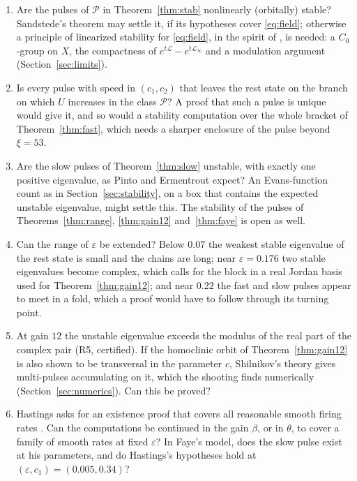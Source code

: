 \documentclass[11pt]{article}
\theoremstyle{definition}
\newcommand{\eps}{\varepsilon}
\newcommand{\Lop}{\mathcal{L}}
\newcommand{\Pcl}{\mathcal{P}}
\begin{document}
\begin{enumerate}
\item Are the pulses of $\Pcl$ in Theorem~\ref{thm:stab} nonlinearly (orbitally) stable? Sandstede's theorem \cite{sandstede2007} may settle it, if its hypotheses cover \eqref{eq:field}; otherwise a principle of linearized stability for \eqref{eq:field}, in the spirit of \cite{hv2024}, is needed: a $C_0$-group on $X$, the compactness of $e^{t\Lop} - e^{t\Lop_\infty}$ and a modulation argument (Section~\ref{sec:limits}).
\item Is every pulse with speed in $(c_1, c_2)$ that leaves the rest state on the branch on which $U$ increases in the class $\Pcl$? A proof that such a pulse is unique would give it, and so would a stability computation over the whole bracket of Theorem~\ref{thm:fast}, which needs a sharper enclosure of the pulse beyond $\xi = 53$.
\item Are the slow pulses of Theorem~\ref{thm:slow} unstable, with exactly one positive eigenvalue, as Pinto and Ermentrout expect? An Evans-function count as in Section~\ref{sec:stability}, on a box that contains the expected unstable eigenvalue, might settle this. The stability of the pulses of Theorems~\ref{thm:range}, \ref{thm:gain12} and~\ref{thm:faye} is open as well.
\item Can the range of $\eps$ be extended? Below $0.07$ the weakest stable eigenvalue of the rest state is small and the chains are long; near $\eps = 0.176$ two stable eigenvalues become complex, which calls for the block in a real Jordan basis used for Theorem~\ref{thm:gain12}; and near $0.22$ the fast and slow pulses appear to meet in a fold, which a proof would have to follow through its turning point.
\item At gain $12$ the unstable eigenvalue exceeds the modulus of the real part of the complex pair (R5, certified). If the homoclinic orbit of Theorem~\ref{thm:gain12} is also shown to be transversal in the parameter $c$, Shilnikov's theory gives multi-pulses accumulating on it, which the shooting finds numerically (Section~\ref{sec:numerics}). Can this be proved?
\item Hastings asks for an existence proof that covers all reasonable smooth firing rates \cite[p.~2]{hastings2017}. Can the computations be continued in the gain $\beta$, or in $\theta$, to cover a family of smooth rates at fixed $\eps$? In Faye's model, does the slow pulse exist at his parameters, and do Hastings's hypotheses hold at $(\eps, c_1) = (0.005, 0.34)$?
\end{enumerate}
\end{document}

